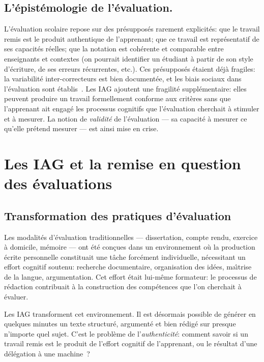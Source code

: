 \subsection{L'\'epist\'emologie de l'\'evaluation.}
L'\'evaluation scolaire repose sur des pr\'esuppos\'es rarement explicit\'es: que le travail remis est le produit authentique de l'apprenant; que ce travail est repr\'esentatif de ses capacit\'es r\'eelles; que la notation est coh\'erente et comparable entre enseignants et contextes (on pourrait \og{}identifier\fg{} un étudiant à partir de son style d'écriture, de ses erreurs récurrentes, etc.). 
Ces pr\'esuppos\'es \'etaient d\'ej\`a fragiles: la variabilit\'e inter-correcteurs est bien document\'ee, et les biais sociaux dans l'\'evaluation sont \'etablis~\cite{leroux2022}.
Les IAG ajoutent une fragilit\'e suppl\'ementaire: elles peuvent produire un travail formellement conforme aux crit\`eres sans que l'apprenant ait engag\'e les processus cognitifs que l'\'evaluation cherchait \`a stimuler et \`a mesurer. 
La notion de \emph{validit\'e} de l'\'evaluation --- sa capacit\'e \`a mesurer ce qu'elle pr\'etend mesurer --- est ainsi mise en crise.


\newpage
\section{Les IAG et la remise en question des \'evaluations}\label{sec:remise}

\subsection{Transformation des pratiques d'\'evaluation}

Les modalit\'es d'\'evaluation traditionnelles --- dissertation, compte rendu, exercice \`a domicile, m\'emoire --- ont \'et\'e con\c{c}ues dans un environnement o\`u la production \'ecrite personnelle constituait une t\^ache forc\'ement individuelle, n\'ecessitant un effort cognitif soutenu: recherche documentaire, organisation des id\'ees, ma\^\i trise de la langue, argumentation. 
Cet effort \'etait lui-m\^eme formateur: le processus de r\'edaction contribuait \`a la construction des comp\'etences que l'on cherchait \`a \'evaluer.

Les IAG transforment cet environnement. 
Il est d\'esormais possible de g\'en\'erer en quelques minutes un texte structur\'e, argument\'e et bien r\'edig\'e sur presque n'importe quel sujet. 
C'est le probl\`eme de l'\emph{authenticit\'e}: comment savoir si un travail remis est le produit de l'effort cognitif de l'apprenant, ou le r\'esultat d'une d\'el\'egation \`a une machine~?

